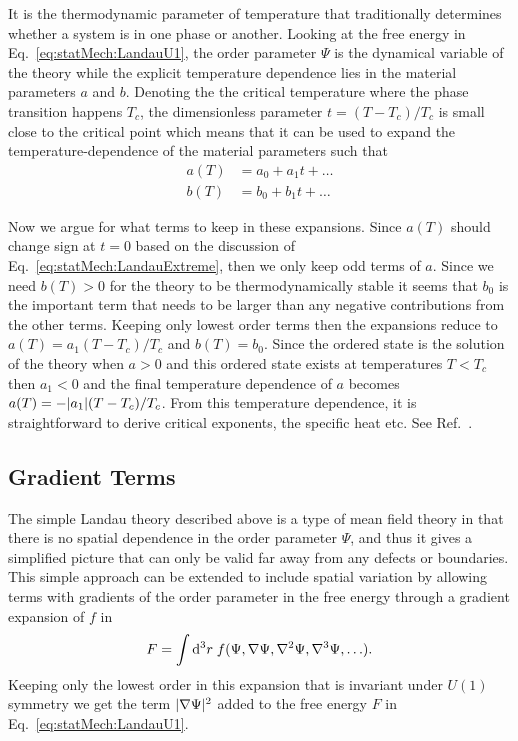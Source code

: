 It is the thermodynamic parameter of temperature that traditionally determines whether a system is in one phase or another.
Looking at the free energy in Eq.~\eqref{eq:statMech:LandauU1}, the order parameter $\Psi$ is the dynamical variable 
of the theory while the explicit temperature dependence lies in the material parameters $a$ and $b$. Denoting the
the critical temperature where the phase transition happens $T_c$, the dimensionless parameter
$t = (T-T_c)/T_c$ is small close to the critical point which means that it can be used to expand the temperature-dependence
of the material parameters such that
\begin{equation}
    \label{eq:statMech:matTempExpan}
    \begin{split}
        a(T) &= a_0 + a_1t + \ldots\\
        b(T) &= b_0 + b_1t + \ldots
    \end{split}
\end{equation}

Now we argue for what terms to keep in these expansions. Since $a(T)$ should change sign at $t=0$ based on the discussion of
Eq.~\eqref{eq:statMech:LandauExtreme}, then we only keep odd terms of $a$.
Since we need $b(T)>0$ for the theory to be thermodynamically stable it seems that $b_0$ is the important term that needs to be
larger than any negative contributions from the other terms. Keeping only lowest order terms then the expansions reduce to
$a(T) = a_1(T-T_c)/T_c$ and $b(T) = b_0$. Since the ordered state is the solution of the theory when $a>0$ and this ordered
state exists at temperatures $T<T_c$ then $a_1<0$ and the final temperature dependence of $a$ becomes
$a(T) = -\lvert a_1 \rvert(T-T_c)/T_c$. From this temperature dependence, it is straightforward to derive critical exponents, the specific
heat etc. See Ref.~\cite{Nishimori15}.

\subsection{Gradient Terms}

The simple Landau theory described above is a type of mean field theory in that there is no spatial dependence in the
order parameter $\Psi$, and thus it gives a simplified picture that can only be valid far away from any defects or boundaries. This simple approach
can be extended to include spatial variation by allowing terms with gradients of the order parameter in the free energy through
a gradient expansion of $f$ in
\begin{equation}
    \label{eq:statMech:gradTerms:gradExpansion}
    F = \int\mathop{\textrm{d}\kern0em^3r\kern0.1em}f(\Psi, \nabla\Psi, \nabla^2\Psi, \nabla^3\Psi, \ldots).
\end{equation}
Keeping only the lowest order in this expansion that is invariant under $U(1)$ symmetry we get the term
$\lvert \nabla\Psi \rvert^2$ added to the free energy $F$ in Eq.~\eqref{eq:statMech:LandauU1}.

